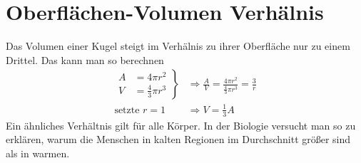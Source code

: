 \documentclass[ngerman]{scrartcl}
\begin{document}
\section{Oberflächen-Volumen Verhälnis} \label{O/V-Verhaeltnis}
	Das Volumen einer Kugel steigt im Verhälnis zu ihrer Oberfläche nur zu einem Drittel.
	Das kann man so berechnen
		\begin{align*}
			\left.
			\begin{aligned}
			A &= 4 \pi r^2 \\
			V &= \frac{4}{3} \pi r^3 
			\end{aligned}
			\right\}
			&\Rightarrow 
			\frac{A}{V} = \frac{4 \pi r^2}{\frac{4}{3} \pi r^3} = \frac{3}{r} \\
			\text{setzte }r = 1 &\Rightarrow V = \frac{1}{3} A			
		\end{align*}
	Ein ähnliches Verhältnis gilt für alle Körper. In der Biologie versucht man so zu erklären, warum die Menschen in kalten Regionen im Durchschnitt größer sind als in warmen. 
\newpage
\printbibliography
\end{document}
